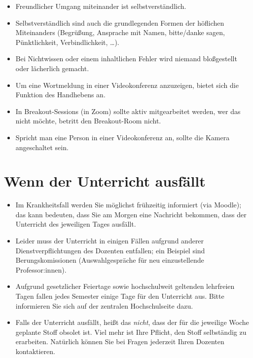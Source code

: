 \documentclass[
  a4paper,
  DIV=11]{scrreprt}
\providecommand{\tightlist}{%
  \setlength{\itemsep}{0pt}\setlength{\parskip}{0pt}}\usepackage{longtable,booktabs,array}
\theoremstyle{definition}
\theoremstyle{definition}
\theoremstyle{remark}
\begin{document}
\begin{itemize}
\tightlist
\item
  Freundlicher Umgang miteinander ist selbstverständlich.
\item
  Selbstverständlich sind auch die grundlegenden Formen der höflichen
  Miteinanders (Begrüßung, Ansprache mit Namen, bitte/danke sagen,
  Pünktlichkeit, Verbindlichkeit, \ldots).
\item
  Bei Nichtwissen oder einem inhaltlichen Fehler wird niemand
  bloßgestellt oder lächerlich gemacht.
\item
  Um eine Wortmeldung in einer Videokonferenz anzuzeigen, bietet sich
  die Funktion des Handhebens an.
\item
  In Breakout-Sessions (in Zoom) sollte aktiv mitgearbeitet werden, wer
  das nicht möchte, betritt den Breakout-Room nicht.
\item
  Spricht man eine Person in einer Videokonferenz an, sollte die Kamera
  angeschaltet sein.
\end{itemize}

\hypertarget{wenn-der-unterricht-ausfuxe4llt}{%
\section*{Wenn der Unterricht
ausfällt}\label{wenn-der-unterricht-ausfuxe4llt}}


\begin{itemize}
\tightlist
\item
  Im Krankheitsfall werden Sie möglichst frühzeitig informiert (via
  Moodle); das kann bedeuten, dass Sie am Morgen eine Nachricht
  bekommen, dass der Unterricht des jeweiligen Tages ausfällt.
\item
  Leider muss der Unterricht in einigen Fällen aufgrund anderer
  Dienstverpflichtungen des Dozenten entfallen; ein Beispiel sind
  Berungskomissionen (Auswahlgespräche für neu einzustellende
  Professor:innen).
\item
  Aufgrund gesetzlicher Feiertage sowie hochschulweit geltenden
  lehrfreien Tagen fallen jedes Semester einige Tage für den Unterricht
  aus. Bitte informieren Sie sich auf der zentralen Hochschulseite dazu.
\item
  Falls der Unterricht ausfällt, heißt das \emph{nicht}, dass der für
  die jeweilige Woche geplante Stoff obsolet ist. Viel mehr ist Ihre
  Pflicht, den Stoff selbständig zu erarbeiten. Natürlich können Sie bei
  Fragen jederzeit Ihren Dozenten kontaktieren.
\end{itemize}
\end{document}

